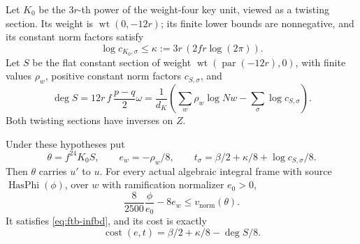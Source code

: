 Let \(K_0\) be the \(3r\)-th power of the weight-four key unit,
viewed as a twisting section.  Its weight is
\(\operatorname{wt}(0,-12r)\); its finite lower bounds are
nonnegative, and its constant norm factors satisfy
\[
 \log c_{K_0,\sigma}\leq
 \kappa:=3r\,(2fr\log(2\pi)).
\]
Let \(S\) be the flat constant section of weight
\(\operatorname{wt}(\operatorname{par}(-12r),0)\), with finite
values \(\rho_w\), positive constant norm factors \(c_{S,\sigma}\),
and
\[
 \deg S
 =12r\,f\,\frac{p-q}{2}\omega
 =\frac1{d_K}\left(\sum_w\rho_w\log Nw
                         -\sum_\sigma\log c_{S,\sigma}\right).
 \tag{C9}\label{eq:ftb-flat-carry-deg}
\]
Both twisting sections have inverses on \(Z\).

\begin{srproposition}
\label{prop:ftb-carry-explicit}
Under these hypotheses put
\[
 \theta=f^{24}K_0S,\qquad
 e_w=-\rho_w/8,\qquad
 t_\sigma=\beta/2+\kappa/8+\log c_{S,\sigma}/8.
 \tag{C10}\label{eq:ftb-carry-choice}
\]
Then \(\theta\) carries \(u'\) to \(u\).  For every actual
algebraic integral frame with source
\(\operatorname{HasPhi}(\phi)\), over \(w\) with ramification
normalizer \(e_0>0\),
\[
 \frac8{2500}\frac{\phi}{e_0}-8e_w
           \leq v_{\mathrm{norm}}(\theta).          \tag{C11}\label{eq:ftb-carry-finite}
\]
It satisfies \eqref{eq:ftb-infbd}, and its cost is exactly
\[
          \operatorname{cost}(e,t)
                =\beta/2+\kappa/8-\deg S/8.         \tag{C12}\label{eq:ftb-carry-cost}
\]
\end{srproposition}

